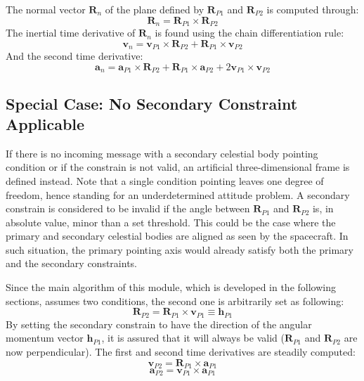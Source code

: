 \documentclass[]{AVSSimReportMemo}
\begin{document}
The normal vector $\bm{R}_{n}$ of the plane defined by $\bm{R}_{P1}$ and $\bm{R}_{P2}$ is computed through:
\begin{equation}
	\bm R_{n} =\bm{R}_{P1} \times \bm{R}_{P2}
\end{equation}
The inertial time derivative of $\bm{R}_n$ is found using the chain differentiation rule:
\begin{equation}
	\bm {v}_{n} = \bm{v}_{P1} \times \bm{R}_{P2} + \bm{R}_{P1} \times \bm{v}_{P2}
\end{equation}
And the second time derivative:
\begin{equation}
	\bm {a}_{n} = \bm{a}_{P1} \times \bm{R}_{P2} + \bm{R}_{P1} \times \bm{a}_{P2}  + 2 \bm{v}_{P1} \times \bm{v}_{P2}
\end{equation}
\subsection{ Special Case: No Secondary Constraint Applicable}
If there is no incoming message with a secondary celestial body pointing condition or if the constrain is not valid, an artificial three-dimensional frame is defined instead. Note that a single condition pointing leaves one degree of freedom, hence standing for an underdetermined attitude problem. A secondary constrain is considered to be invalid if the angle between $\bm{R}_{P1}$ and $\bm{R}_{P2}$ is, in absolute value, minor than a set threshold. This could be the case where the primary and secondary celestial bodies are aligned as seen by the spacecraft. In such situation, the primary pointing axis would already satisfy both the primary and the secondary constraints.

Since the main algorithm of this module, which is developed in the following sections, assumes two conditions, the second one is arbitrarily set as following:
\begin{equation}
		 \bm{R}_{P2} = \bm{R}_{P1} \times \bm{v}_{P1} \equiv  \bm{h}_{P1}
\end{equation}
By setting the secondary constrain to have the direction of the angular momentum vector $ \bm{h}_{P1}$, it is assured that it will always be valid ($\bm{R}_{P1}$ and $\bm{R}_{P2}$ are now perpendicular).
The first and second time derivatives are steadily computed:
\begin{equation}
	\bm{v}_{P2} =  \bm{R}_{P1} \times \bm{a}_{P1}
\end{equation}
\begin{equation}
	\bm{a}_{P2} =  \bm{v}_{P1} \times \bm{a}_{P1}
\end{equation}
\end{document}
